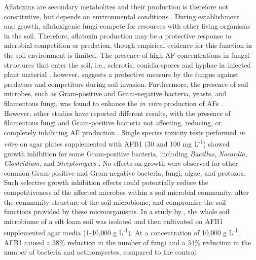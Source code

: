 Aflatoxins are secondary metabolites and their production is therefore not constitutive, but depends on environmental conditions \citep{carter2013aflatoxins}. During establishment and growth, aflatoxigenic fungi compete for resources with other living organisms in the soil. Therefore, aflatoxin production may be a protective response to microbial competition or predation, though empirical evidence for this function in the soil environment is limited. The presence of high AF concentrations in fungal structures that enter the soil, i.e., sclerotia, conidia spores and hyphae in infected plant material \citep{wicklow1983intrafungal}, however, suggests a protective measure by the fungus against predators and competitors during soil invasion. Furthermore, the presence of soil microbes, such as Gram-positive and Gram-negative bacteria, yeasts, and filamentous fungi, was found to enhance the \textit{in vitro} production of AFs \citep{weckbach1977aflatoxin, cuero1987stimulation, type1980interference}. However, other studies have reported different results, with the presence of filamentous fungi and Gram-positive bacteria not affecting, reducing, or completely inhibiting AF production \citep{weckbach1977aflatoxin, type1980interference}. Single species toxicity tests performed \textit{in vitro} on agar plates supplemented with AFB1 (30 and 100 mg L\textsuperscript{-1}) showed growth inhibition for some Gram-positive bacteria, including \textit{Bacillus}, \textit{Nocardia}, \textit{Clostridium}, and \textit{Streptomyces} \citep{burmeister1966survey, arai1967antimicrobial}. No effects on growth were observed for other common Gram-positive and Gram-negative bacteria, fungi, algae, and protozoa. Such selective growth inhibition effects could potentially reduce the competitiveness of the affected microbes within a soil microbial community, alter the community structure of the soil microbiome, and compromise the soil functions provided by these microorganisms. In a study by  \citet{angle1981aflatoxin}, the whole soil microbiome of a silt loam soil was isolated and then cultivated on AFB1 supplemented agar media (1-10,000 \textmu g L\textsuperscript{-1}). At a concentration of 10,000 \textmu g L\textsuperscript{-1}, AFB1 caused a 38\% reduction in the number of fungi and a 34\% reduction in the number of bacteria and actinomycetes, compared to the control.


